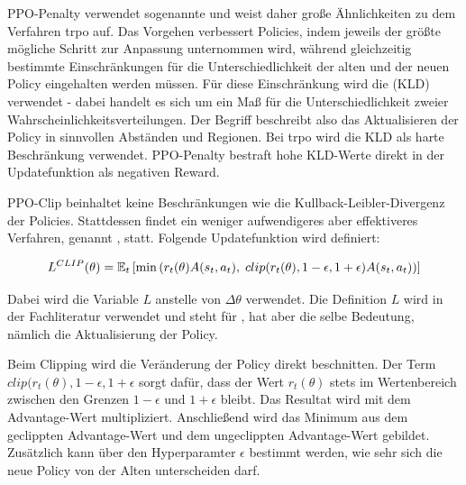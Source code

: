 PPO-Penalty verwendet sogenannte  und weist daher große Ähnlichkeiten zu dem Verfahren \ac{trpo} \cite{trpo} auf. Das Vorgehen verbessert Policies, indem jeweils der größte mögliche Schritt zur Anpassung unternommen wird, während gleichzeitig bestimmte Einschränkungen für die Unterschiedlichkeit der alten und der neuen Policy eingehalten werden müssen. Für diese Einschränkung wird die  (KLD) verwendet \cite{kl_div_original} \cite{kl_div_book} - dabei handelt es sich um ein Maß für die Unterschiedlichkeit zweier Wahrscheinlichkeitsverteilungen. Der Begriff  beschreibt also das Aktualisieren der Policy in sinnvollen Abständen und Regionen. Bei \ac{trpo} wird die KLD als harte Beschränkung verwendet. PPO-Penalty bestraft hohe KLD-Werte direkt in der Updatefunktion als negativen Reward.

PPO-Clip beinhaltet keine Beschränkungen wie die Kullback-Leibler-Divergenz der Policies. Stattdessen findet ein weniger aufwendigeres aber effektiveres Verfahren, genannt , statt. Folgende Updatefunktion wird definiert:

$$  L^{CLIP}(\theta)  = \mathbb{E}_t     \left[ \operatorname*{min} \left(
    r_t(\theta) A(s_t,a_t), \; clip(r_t(\theta), 1 - \epsilon, 1 + \epsilon) A(s_t,a_t)
\right) \right]  $$

Dabei wird die Variable $L$ anstelle von $\Delta \theta$ verwendet. Die Definition $L$ wird in der Fachliteratur verwendet und steht für , hat aber die selbe Bedeutung, nämlich die Aktualisierung der Policy.

Beim Clipping wird die Veränderung der Policy direkt beschnitten. Der Term $ clip(r_t(\theta), 1 - \epsilon, 1 + \epsilon $ sorgt dafür, dass der Wert $r_t(\theta)$ stets im Wertenbereich zwischen den Grenzen $ 1 - \epsilon $ und $ 1 + \epsilon $ bleibt. Das Resultat wird mit dem Advantage-Wert multipliziert. Anschließend wird das Minimum aus dem geclippten Advantage-Wert und dem ungeclippten Advantage-Wert gebildet. Zusätzlich kann über den Hyperparamter $\epsilon$ bestimmt werden, wie sehr sich die neue Policy von der Alten unterscheiden darf.
